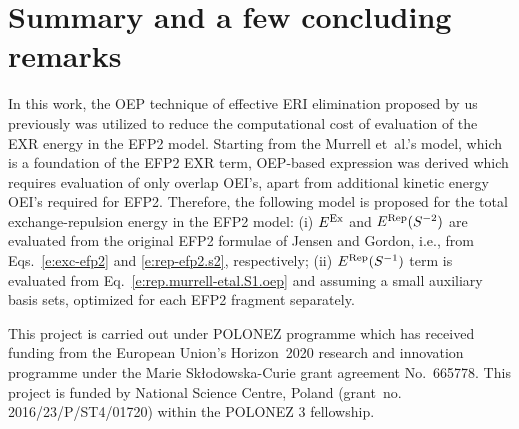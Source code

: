 \section{\label{s:6.conclusions}Summary and a few concluding remarks}

In this work, the OEP technique of effective ERI elimination
proposed by us previously was utilized to reduce the computational cost
of evaluation of the EXR energy in the EFP2 model.
Starting from the Murrell et~al.'s model, which is a foundation of the EFP2 EXR term,
OEP\hyp{}based expression was derived which requires evaluation of only overlap
OEI's, apart from additional kinetic energy OEI's required for EFP2. 
Therefore, the following model is proposed for the
total exchange\hyp{}repulsion energy in the EFP2 model: 
(i) $E^{\rm Ex}$ and $E^{\rm Rep}(S^{-2})$ are evaluated
from the original EFP2 formulae of Jensen and Gordon, i.e.,
from Eqs.~\eqref{e:exc-efp2} and \eqref{e:rep-efp2.s2}, respectively;
(ii) $E^{\rm Rep}(S^{-1})$ term is evaluated from Eq.~\eqref{e:rep.murrell-etal.S1.oep}
and assuming a small auxiliary basis sets, optimized for each
EFP2 fragment separately.


\begin{acknowledgments}
This project is carried out under POLONEZ programme which has received funding from the European Union's
Horizon~2020 research and innovation programme under the Marie Sk{\l}odowska-Curie grant agreement 
No.~665778. This project is funded by National Science Centre, Poland 
(grant~no. 2016/23/P/ST4/01720) within the POLONEZ 3 fellowship.
\end{acknowledgments}






